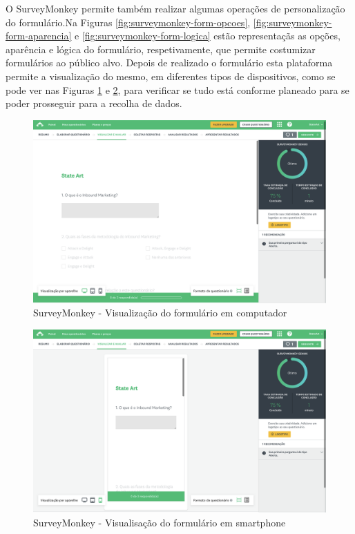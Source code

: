 O SurveyMonkey permite também realizar algumas operações de personalização do formulário.Na Figuras \ref{fig:surveymonkey-form-opcoes}, \ref{fig:surveymonkey-form-aparencia} e \ref{fig:surveymonkey-form-logica} estão representaçãs as opções, aparência e lógica do formulário, respetivamente, que permite costumizar formulários ao público alvo. 
Depois de realizado o formulário esta plataforma permite a visualização do mesmo, em diferentes tipos de dispositivos, como se pode ver nas Figuras \ref{fig:surveymonkey-form-test-pc} e \ref{fig:surveymonkey-form-test-phone}, para verificar se tudo está conforme planeado para se poder prosseguir para a recolha de dados. 
 \newpage

\begin{figure}[ht!]
	\begin{center}
		\includegraphics[width=1\textwidth]{img/sm/surveymonkey-form-test-pc}
		\caption{SurveyMonkey - Visualização do formulário em computador }
		\label{fig:surveymonkey-form-test-pc}
	\end{center}
\end{figure}

\begin{figure}[ht!]
	\begin{center}
		\includegraphics[width=1\textwidth]{img/sm/surveymonkey-form-test-phone}
		\caption{SurveyMonkey - Visualisação do formulário em smartphone }
		\label{fig:surveymonkey-form-test-phone}
	\end{center}
\end{figure}


